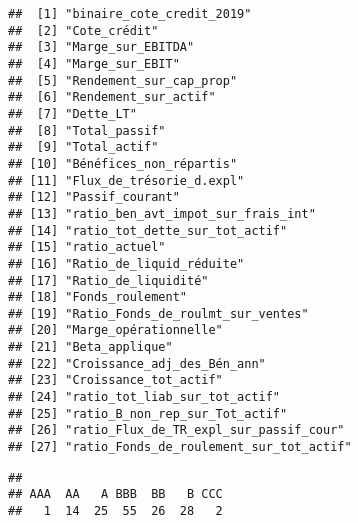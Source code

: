\documentclass[
]{article}
\newenvironment{Shaded}{\begin{snugshade}}{\end{snugshade}}
\newcommand{\CommentTok}[1]{\textcolor[rgb]{0.56,0.35,0.01}{\textit{#1}}}
\newcommand{\DecValTok}[1]{\textcolor[rgb]{0.00,0.00,0.81}{#1}}
\newcommand{\KeywordTok}[1]{\textcolor[rgb]{0.13,0.29,0.53}{\textbf{#1}}}
\newcommand{\NormalTok}[1]{#1}
\newcommand{\OperatorTok}[1]{\textcolor[rgb]{0.81,0.36,0.00}{\textbf{#1}}}
\begin{document}
\begin{verbatim}
##  [1] "binaire_cote_credit_2019"              
##  [2] "Cote_crédit"                           
##  [3] "Marge_sur_EBITDA"                      
##  [4] "Marge_sur_EBIT"                        
##  [5] "Rendement_sur_cap_prop"                
##  [6] "Rendement_sur_actif"                   
##  [7] "Dette_LT"                              
##  [8] "Total_passif"                          
##  [9] "Total_actif"                           
## [10] "Bénéfices_non_répartis"                
## [11] "Flux_de_trésorie_d.expl"               
## [12] "Passif_courant"                        
## [13] "ratio_ben_avt_impot_sur_frais_int"     
## [14] "ratio_tot_dette_sur_tot_actif"         
## [15] "ratio_actuel"                          
## [16] "Ratio_de_liquid_réduite"               
## [17] "Ratio_de_liquidité"                    
## [18] "Fonds_roulement"                       
## [19] "Ratio_Fonds_de_roulmt_sur_ventes"      
## [20] "Marge_opérationnelle"                  
## [21] "Beta_applique"                         
## [22] "Croissance_adj_des_Bén_ann"            
## [23] "Croissance_tot_actif"                  
## [24] "ratio_tot_liab_sur_tot_actif"          
## [25] "ratio_B_non_rep_sur_Tot_actif"         
## [26] "ratio_Flux_de_TR_expl_sur_passif_cour" 
## [27] "ratio_Fonds_de_roulement_sur_tot_actif"
\end{verbatim}

\begin{Shaded}
\end{Shaded}

\begin{verbatim}
## 
## AAA  AA   A BBB  BB   B CCC 
##   1  14  25  55  26  28   2
\end{verbatim}

\begin{Shaded}
\end{Shaded}
\end{document}

